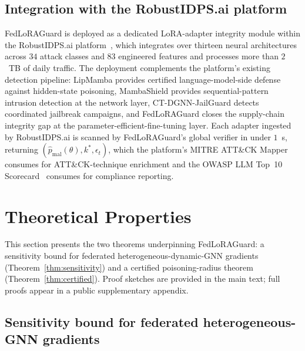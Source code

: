 \documentclass[12pt,a4paper]{article}
\theoremstyle{definition}
\theoremstyle{remark}
\newcommand{\modelname}{FedLoRAGuard}
\begin{document}
\subsection{Integration with the RobustIDPS.ai platform}
\label{subsec:platform}

\modelname{} is deployed as a dedicated LoRA-adapter integrity module within the RobustIDPS.ai platform~\cite{anaedevha2026robustidps}, which integrates over thirteen neural architectures across $34$ attack classes and $83$ engineered features and processes more than $2$~TB of daily traffic. The deployment complements the platform's existing detection pipeline: LipMamba provides certified language-model-side defense against hidden-state poisoning, MambaShield provides sequential-pattern intrusion detection at the network layer, CT-DGNN-JailGuard detects coordinated jailbreak campaigns, and \modelname{} closes the supply-chain integrity gap at the parameter-efficient-fine-tuning layer. Each adapter ingested by RobustIDPS.ai is scanned by \modelname{}'s global verifier in under $1$~s, returning $(\hat{p}_{\mathrm{mal}}(\theta), k^*, \epsilon_t)$, which the platform's MITRE ATT\&CK Mapper consumes for ATT\&CK-technique enrichment and the OWASP LLM Top~10 Scorecard~\cite{anaedevha2026robustidps} consumes for compliance reporting.


\section{Theoretical Properties}
\label{sec:theory}

This section presents the two theorems underpinning \modelname{}: a sensitivity bound for federated heterogeneous-dynamic-GNN gradients (Theorem~\ref{thm:sensitivity}) and a certified poisoning-radius theorem (Theorem~\ref{thm:certified}). Proof sketches are provided in the main text; full proofs appear in a public supplementary appendix.

\subsection{Sensitivity bound for federated heterogeneous-GNN gradients}
\end{document}
